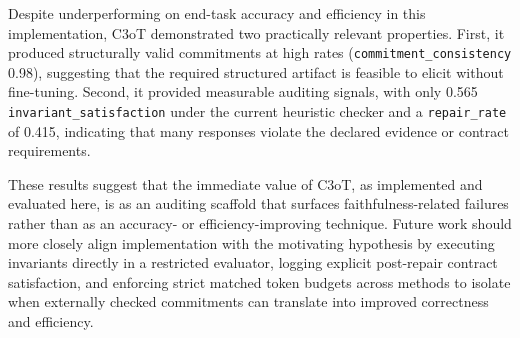 \documentclass[journal,article,submit,pdftex,moreauthors]{Definitions/mdpi}
\begin{document}
{Despite underperforming on end-task accuracy and efficiency in this implementation, C3oT demonstrated two practically relevant properties. First, it produced structurally valid commitments at high rates (\texttt{commitment\_consistency} 0.98), suggesting that the required structured artifact is feasible to elicit without fine-tuning. Second, it provided measurable auditing signals, with only 0.565 \texttt{invariant\_satisfaction} under the current heuristic checker and a \texttt{repair\_rate} of 0.415, indicating that many responses violate the declared evidence or contract requirements.

These results suggest that the immediate value of C3oT, as implemented and evaluated here, is as an auditing scaffold that surfaces faithfulness-related failures rather than as an accuracy- or efficiency-improving technique. Future work should more closely align implementation with the motivating hypothesis by executing invariants directly in a restricted evaluator, logging explicit post-repair contract satisfaction, and enforcing strict matched token budgets across methods to isolate when externally checked commitments can translate into improved correctness and efficiency.

\vspace{6pt}





}
\end{document}
